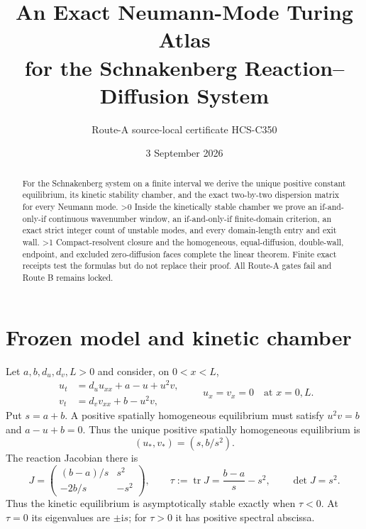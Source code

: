 \documentclass[10pt]{article}
\title{An Exact Neumann-Mode Turing Atlas\\
for the Schnakenberg Reaction--Diffusion System}
\author{Route-A source-local certificate HCS-C350}
\date{3 September 2026}
\providecommand{\CRevisionRound}{2}
\begin{document}
\maketitle
\begin{abstract}
For the Schnakenberg system on a finite interval we derive the unique positive
constant equilibrium, its kinetic stability chamber, and the exact
two-by-two dispersion matrix for every Neumann mode.
\ifnum\CRevisionRound>0
Inside the kinetically stable chamber we prove an if-and-only-if continuous
wavenumber window, an if-and-only-if finite-domain criterion, an exact strict
integer count of unstable modes, and every domain-length entry and exit wall.
\fi
\ifnum\CRevisionRound>1
Compact-resolvent closure and the homogeneous, equal-diffusion, double-wall,
endpoint, and excluded zero-diffusion faces complete the linear theorem.
Finite exact receipts test the formulas but do not replace their proof.
All Route-A gates fail and Route B remains locked.
\fi
\end{abstract}

\section{Frozen model and kinetic chamber}
Let $a,b,d_u,d_v,L>0$ and consider, on $0<x<L$,
\begin{equation}\label{eq:pde}
 \begin{split}
 u_t&=d_u u_{xx}+a-u+u^2v,\\
 v_t&=d_v v_{xx}+b-u^2v,
 \end{split}
 \qquad u_x=v_x=0\quad\text{at }x=0,L.
\end{equation}
Put $s=a+b$.  A positive spatially homogeneous equilibrium must satisfy
$u^2v=b$ and $a-u+b=0$.  Thus the unique positive spatially homogeneous
equilibrium is
\begin{equation}\label{eq:eq}
 (u_*,v_*)=(s,b/s^2).
\end{equation}
The reaction Jacobian there is
\begin{equation}\label{eq:J}
 J=\begin{pmatrix}(b-a)/s&s^2\\-2b/s&-s^2\end{pmatrix},
 \qquad \tau:=\operatorname{tr}J=\frac{b-a}{s}-s^2,
 \qquad \det J=s^2.
\end{equation}
Thus the kinetic equilibrium is asymptotically stable exactly when
$\tau<0$.  At $\tau=0$ its eigenvalues are $\pm \mathrm{i}s$; for
$\tau>0$ it has positive spectral abscissa.
\end{document}
